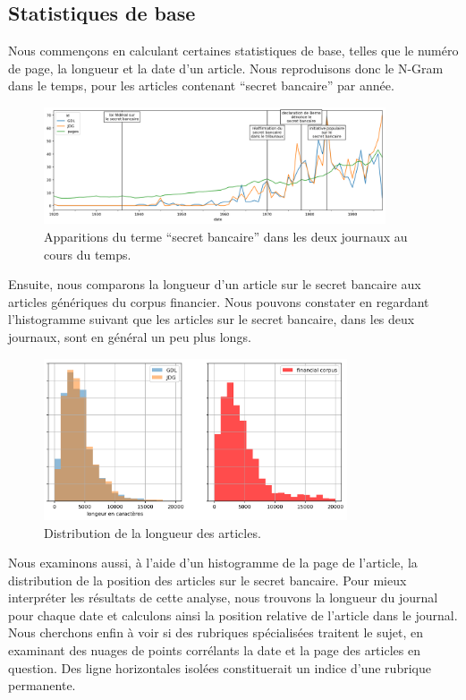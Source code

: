 \documentclass[a4paper, 11pt]{article}
\begin{document}
\hypertarget{statistiques-de-base}{%
\subsection{Statistiques de base}\label{statistiques-de-base}}

Nous commençons en calculant certaines statistiques de base, telles que
le numéro de page, la longueur et la date d'un article. Nous
reproduisons donc le N-Gram dans le temps, pour les articles contenant
``secret bancaire'' par année.

\begin{figure}
\centering
\includegraphics[width=0.9\textwidth]{methodology/ngram_ts.png}
\caption{Apparitions du terme ``secret bancaire'' dans les deux journaux
au cours du temps.}
\end{figure}

Ensuite, nous comparons la longueur d'un article sur le secret bancaire
aux articles génériques du corpus financier. Nous pouvons constater en
regardant l'histogramme suivant que les articles sur le secret bancaire,
dans les deux journaux, sont en général un peu plus longs.

\begin{figure}
\centering
\includegraphics[width=0.8\textwidth ]{methodology/article_lengths.png}
\caption{Distribution de la longueur des articles.}
\end{figure}

Nous examinons aussi, à l'aide d'un histogramme de la page de l'article,
la distribution de la position des articles sur le secret bancaire. Pour
mieux interpréter les résultats de cette analyse, nous trouvons la
longueur du journal pour chaque date et calculons ainsi la position
relative de l'article dans le journal. Nous cherchons enfin à voir si
des rubriques spécialisées traitent le sujet, en examinant des nuages de
points corrélants la date et la page des articles en question. Des ligne
horizontales isolées constituerait un indice d'une rubrique permanente.
\end{document}
